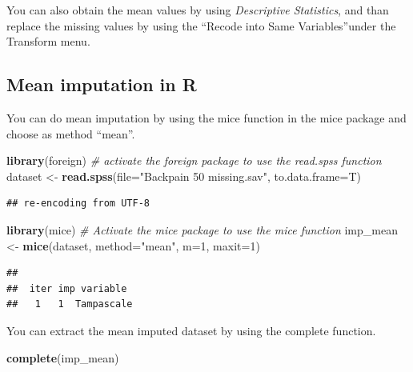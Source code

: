 \documentclass[]{book}
\newenvironment{Shaded}{\begin{snugshade}}{\end{snugshade}}
\newcommand{\KeywordTok}[1]{\textcolor[rgb]{0.13,0.29,0.53}{\textbf{#1}}}
\newcommand{\DataTypeTok}[1]{\textcolor[rgb]{0.13,0.29,0.53}{#1}}
\newcommand{\DecValTok}[1]{\textcolor[rgb]{0.00,0.00,0.81}{#1}}
\newcommand{\StringTok}[1]{\textcolor[rgb]{0.31,0.60,0.02}{#1}}
\newcommand{\CommentTok}[1]{\textcolor[rgb]{0.56,0.35,0.01}{\textit{#1}}}
\newcommand{\NormalTok}[1]{#1}
\begin{document}
You can also obtain the mean values by using \emph{Descriptive
Statistics}, and than replace the missing values by using the ``Recode
into Same Variables''under the Transform menu.

\subsection{Mean imputation in R}\label{mean-imputation-in-r}

You can do mean imputation by using the mice function in the mice
package and choose as method ``mean''.

\begin{Shaded}
\begin{Highlighting}[]
\KeywordTok{library}\NormalTok{(foreign) }\CommentTok{# activate the foreign package to use the read.spss function}
\NormalTok{dataset <-}\StringTok{ }\KeywordTok{read.spss}\NormalTok{(}\DataTypeTok{file=}\StringTok{"Backpain 50 missing.sav"}\NormalTok{, }\DataTypeTok{to.data.frame=}\NormalTok{T)}
\end{Highlighting}
\end{Shaded}

\begin{verbatim}
## re-encoding from UTF-8
\end{verbatim}

\begin{Shaded}
\begin{Highlighting}[]
\KeywordTok{library}\NormalTok{(mice) }\CommentTok{# Activate the mice package to use the mice function}
\NormalTok{imp_mean <-}\StringTok{ }\KeywordTok{mice}\NormalTok{(dataset, }\DataTypeTok{method=}\StringTok{"mean"}\NormalTok{, }\DataTypeTok{m=}\DecValTok{1}\NormalTok{, }\DataTypeTok{maxit=}\DecValTok{1}\NormalTok{)}
\end{Highlighting}
\end{Shaded}

\begin{verbatim}
## 
##  iter imp variable
##   1   1  Tampascale
\end{verbatim}

You can extract the mean imputed dataset by using the complete function.

\begin{Shaded}
\begin{Highlighting}[]
\KeywordTok{complete}\NormalTok{(imp_mean)}
\end{Highlighting}
\end{Shaded}
\end{document}
